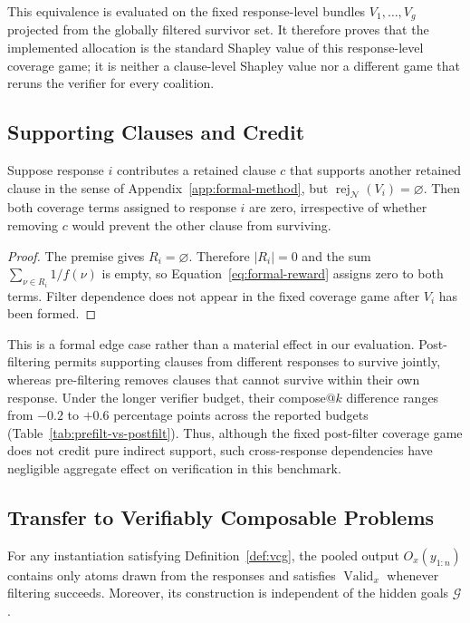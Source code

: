 This equivalence is evaluated on the fixed response-level bundles
\(V_1,\ldots,V_g\) projected from the globally filtered survivor set.  It
therefore proves that the implemented allocation is the standard Shapley value
of this response-level coverage game; it is neither a clause-level Shapley
value nor a different game that reruns the verifier for every coalition.

\subsection{Supporting Clauses and Credit}

\begin{proposition}
\label{prop:support-credit}
Suppose response \(i\) contributes a retained clause \(c\) that supports
another retained clause in the sense of Appendix~\ref{app:formal-method}, but
\(\operatorname{rej}_{\mathcal N}(V_i)=\varnothing\).  Then both coverage
terms assigned to response \(i\) are zero, irrespective of whether removing
\(c\) would prevent the other clause from surviving.
\end{proposition}

\begin{proof}
The premise gives \(R_i=\varnothing\).  Therefore \(|R_i|=0\) and the sum
\(\sum_{\nu\in R_i}1/f(\nu)\) is empty, so Equation~\eqref{eq:formal-reward}
assigns zero to both terms.  Filter dependence does not appear in the fixed
coverage game after \(V_i\) has been formed.
\end{proof}

This is a formal edge case rather than a material effect in our evaluation.
Post-filtering permits supporting clauses from different responses to survive
jointly, whereas pre-filtering removes clauses that cannot survive within
their own response.  Under the longer verifier budget, their compose@\(k\)
difference ranges from \(-0.2\) to \(+0.6\) percentage points across the
reported budgets (Table~\ref{tab:prefilt-vs-postfilt}).  Thus, although the
fixed post-filter coverage game does not credit pure indirect support, such
cross-response dependencies have negligible aggregate effect on verification
in this benchmark.

\subsection{Transfer to Verifiably Composable Problems}

\begin{proposition}
\label{prop:composable-transfer}
For any instantiation satisfying Definition~\ref{def:vcg}, the pooled output
\(O_x(y_{1:n})\) contains only atoms drawn from the responses and satisfies
\(\operatorname{Valid}_x\) whenever filtering succeeds.  Moreover, its
construction is independent of the hidden goals \(\mathcal G\).
\end{proposition}

